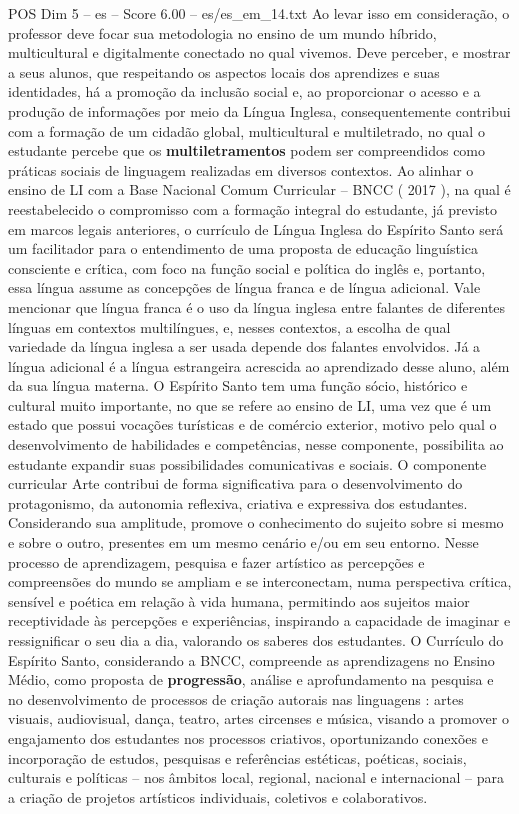 \begin{textsample}{POS Dim 5 – es – Score 6.00 – es/es\_em\_14.txt}
Ao levar isso em consideração, o professor deve focar sua metodologia no ensino de um mundo híbrido, multicultural e digitalmente conectado no qual vivemos.
Deve perceber, e mostrar a seus alunos, que respeitando os aspectos locais dos aprendizes e suas identidades, há a promoção da inclusão social e, ao proporcionar o acesso e a produção de informações por meio da Língua Inglesa, consequentemente contribui com a formação de um cidadão global, multicultural e multiletrado, no qual o estudante percebe que os \textbf{multiletramentos} podem ser compreendidos como práticas sociais de linguagem realizadas em diversos contextos.
Ao alinhar o ensino de LI com a Base Nacional Comum Curricular – BNCC ( 2017 ), na qual é reestabelecido o compromisso com a formação integral do estudante, já previsto em marcos legais anteriores, o currículo de Língua Inglesa do Espírito Santo será um facilitador para o entendimento de uma proposta de educação linguística consciente e crítica, com foco na função social e política do inglês e, portanto, essa língua assume as concepções de língua franca e de língua adicional.
Vale mencionar que língua franca é o uso da língua inglesa entre falantes de diferentes línguas em contextos multilíngues, e, nesses contextos, a escolha de qual variedade da língua inglesa a ser usada depende dos falantes envolvidos.
Já a língua adicional é a língua estrangeira acrescida ao aprendizado desse aluno, além da sua língua materna.
O Espírito Santo tem uma função sócio, histórico e cultural muito importante, no que se refere ao ensino de LI, uma vez que é um estado que possui vocações turísticas e de comércio exterior, motivo pelo qual o desenvolvimento de habilidades e competências, nesse componente, possibilita ao estudante expandir suas possibilidades comunicativas e sociais.
O componente curricular Arte contribui de forma significativa para o desenvolvimento do protagonismo, da autonomia reflexiva, criativa e expressiva dos estudantes.
Considerando sua amplitude, promove o conhecimento do sujeito sobre si mesmo e sobre o outro, presentes em um mesmo cenário e/ou em seu entorno.
Nesse processo de aprendizagem, pesquisa e fazer artístico as percepções e compreensões do mundo se ampliam e se interconectam, numa perspectiva crítica, sensível e poética em relação à vida humana, permitindo aos sujeitos maior receptividade às percepções e experiências, inspirando a capacidade de imaginar e ressignificar o seu dia a dia, valorando os saberes dos estudantes.
O Currículo do Espírito Santo, considerando a BNCC, compreende as aprendizagens no Ensino Médio, como proposta de \textbf{progressão}, análise e aprofundamento na pesquisa e no desenvolvimento de processos de criação autorais nas linguagens : artes visuais, audiovisual, dança, teatro, artes circenses e música, visando a promover o engajamento dos estudantes nos processos criativos, oportunizando conexões e incorporação de estudos, pesquisas e referências estéticas, poéticas, sociais, culturais e políticas – nos âmbitos local, regional, nacional e internacional – para a criação de projetos artísticos individuais, coletivos e colaborativos.

\end{textsample}
